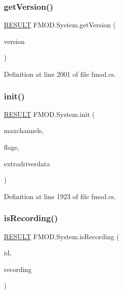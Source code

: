 \subsubsection{\texorpdfstring{get\+Version()}{getVersion()}}
{\footnotesize\ttfamily \hyperlink{namespace_f_m_o_d_a305d1176ef3f8c8815861a60407ac33d}{R\+E\+S\+U\+LT} F\+M\+O\+D.\+System.\+get\+Version (\begin{DoxyParamCaption}\item[{out uint}]{version }\end{DoxyParamCaption})}



Definition at line 2001 of file fmod.\+cs.

\mbox{\label{class_f_m_o_d_1_1_system_ae03363b59a1007c7578a247c2fd49ecf}} 
\subsubsection{\texorpdfstring{init()}{init()}}
{\footnotesize\ttfamily \hyperlink{namespace_f_m_o_d_a305d1176ef3f8c8815861a60407ac33d}{R\+E\+S\+U\+LT} F\+M\+O\+D.\+System.\+init (\begin{DoxyParamCaption}\item[{int}]{maxchannels,  }\item[{\hyperlink{namespace_f_m_o_d_a1eb59ee0c14b7edd1c75e577ecdca8d3}{I\+N\+I\+T\+F\+L\+A\+GS}}]{flags,  }\item[{Int\+Ptr}]{extradriverdata }\end{DoxyParamCaption})}



Definition at line 1923 of file fmod.\+cs.

\mbox{\label{class_f_m_o_d_1_1_system_a8361e335441c2eb6dac2c2e5a0ce8896}} 
\subsubsection{\texorpdfstring{is\+Recording()}{isRecording()}}
{\footnotesize\ttfamily \hyperlink{namespace_f_m_o_d_a305d1176ef3f8c8815861a60407ac33d}{R\+E\+S\+U\+LT} F\+M\+O\+D.\+System.\+is\+Recording (\begin{DoxyParamCaption}\item[{int}]{id,  }\item[{out bool}]{recording }\end{DoxyParamCaption})}



